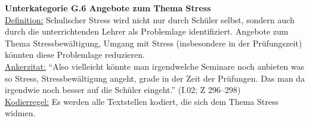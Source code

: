 \noindent
\textbf{Unterkategorie G.6 Angebote zum Thema Stress}\\
\underline{Definition:} Schulischer Stress wird nicht nur durch Schüler selbst, sondern auch durch die unterrichtenden Lehrer als Problemlage identifiziert. Angebote zum Thema Stressbewältigung, Umgang mit Stress (insbesondere in der Prüfungszeit) könnten diese Problemlage reduzieren.\\
\underline{Ankerzitat:} "`Also vielleicht könnte man irgendwelche Seminare noch anbieten was so Stress, Stressbewältigung angeht, grade in der Zeit der Prüfungen. Das man da irgendwie noch besser auf die Schüler eingeht."' (I.02; Z 296--298)\\
\underline{Kodierregel:} Es werden alle Textstellen kodiert, die sich dem Thema Stress widmen.\\

